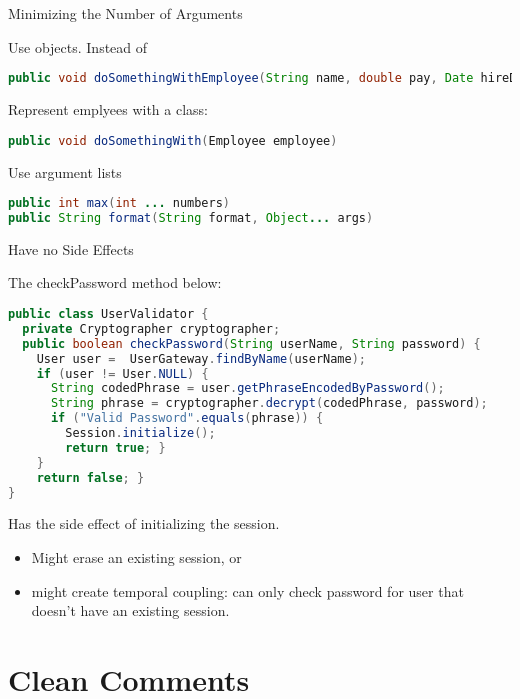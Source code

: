\documentclass{beamer}
\begin{document}
\begin{frame}[fragile]{Minimizing the Number of Arguments}


Use objects.  Instead of
\begin{lstlisting}[language=Java]
public void doSomethingWithEmployee(String name, double pay, Date hireDate)
\end{lstlisting}
Represent emplyees with a class:
\begin{lstlisting}[language=Java]
public void doSomethingWith(Employee employee)
\end{lstlisting}

Use argument lists
\begin{lstlisting}[language=Java]
public int max(int ... numbers)
public String format(String format, Object... args)
\end{lstlisting}


\end{frame}
\begin{frame}[fragile]{Have no Side Effects}


The checkPassword method below:
\begin{lstlisting}[language=Java]
public class UserValidator {
  private Cryptographer cryptographer;
  public boolean checkPassword(String userName, String password) {
    User user =  UserGateway.findByName(userName);
    if (user != User.NULL) {
      String codedPhrase = user.getPhraseEncodedByPassword();
      String phrase = cryptographer.decrypt(codedPhrase, password);
      if ("Valid Password".equals(phrase)) {
        Session.initialize();
        return true; }
    }
    return false; }
}
\end{lstlisting}
Has the side effect of initializing the session.
\begin{itemize}
\item Might erase an existing session, or
\item might create temporal coupling: can only check password for user that doesn't have an existing session.
\end{itemize}


\end{frame}

\section{Clean Comments}
\end{document}
